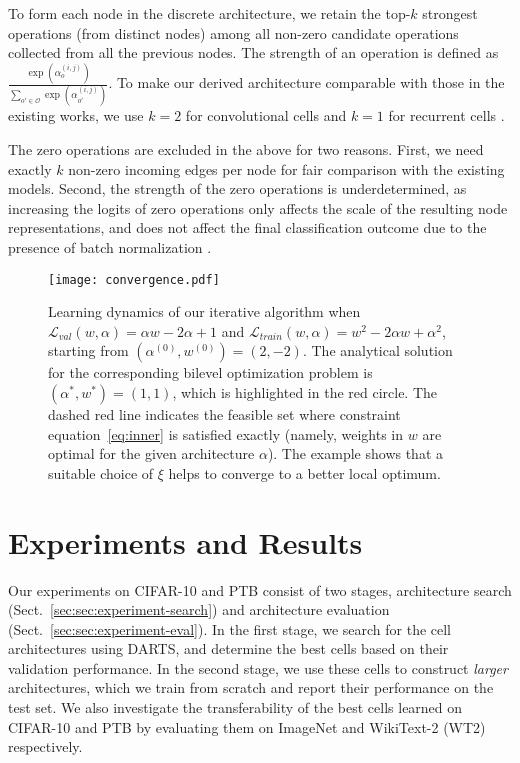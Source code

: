 \documentclass{article}
\def\eqref#1{equation~\ref{#1}}
\begin{document}
To form each node in the discrete architecture,
we retain the top-$k$ strongest operations (from distinct nodes) among all non-zero candidate operations collected from all the previous nodes.
The strength of an operation is defined as $\frac{\exp(\alpha_o^{(i,j)})}{\sum_{o' \in \mathcal{O}} \exp(\alpha_{o'}^{(i,j)})}$.
To make our derived architecture comparable with those in the existing works, we use $k = 2$ for convolutional cells \citep{zoph2017learning, liu2017progressive, real2018regularized} and $k=1$ for recurrent cells \citep{pham2018efficient}.

The zero operations are excluded in the above for two reasons. First, we need exactly $k$ non-zero incoming edges per node for fair comparison with the existing models.
Second, the strength of the zero operations is underdetermined, as increasing the logits of zero operations only affects the scale of the resulting node representations, and does not affect the final classification outcome due to the presence of batch normalization \citep{ioffe2015batch}.

\begin{figure}
  \begin{minipage}[c]{0.41\textwidth}
    \texttt{[image: convergence.pdf]}
  \end{minipage}\hfill
  \begin{minipage}[c]{0.57\textwidth}
	  \caption{Learning dynamics of our iterative algorithm when $\mathcal{L}_{val}(w, \alpha) = \alpha w - 2\alpha + 1$ and $\mathcal{L}_{train}(w, \alpha) = w^2 - 2\alpha w + \alpha^2$, starting from $(\alpha^{(0)}, w^{(0)}) = (2, -2)$. The analytical solution for the corresponding bilevel optimization problem is $(\alpha^*, w^*) = (1, 1)$,
	  which is highlighted in the red circle.
The dashed red line indicates the feasible set where constraint \eqref{eq:inner}
is satisfied exactly (namely, weights in $w$ are optimal for the given architecture $\alpha$).
The example shows that a suitable choice of $\xi$ helps to converge to a better local optimum.}
  \end{minipage}
\end{figure}

\section{Experiments and Results}
\label{sec:experiments}

Our experiments on CIFAR-10 and PTB consist of two stages, architecture search (Sect.~\ref{sec:sec:experiment-search})
and architecture evaluation (Sect.~\ref{sec:sec:experiment-eval}).
In the first stage, we search for the cell architectures using DARTS, and determine the best cells based on their validation performance. 
In the second stage, we use these cells to construct \emph{larger} architectures, which we train from scratch and report their performance on the test set.
We also investigate the transferability of the best cells learned on CIFAR-10 and PTB by evaluating them on ImageNet and WikiText-2 (WT2) respectively.
\end{document}

